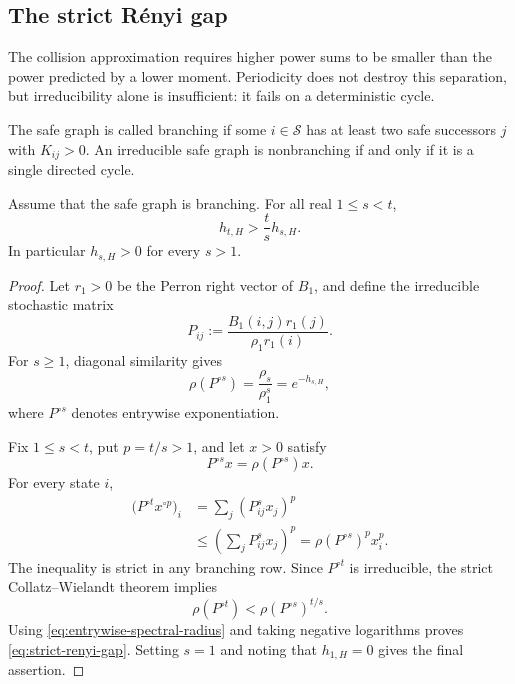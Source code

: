 \subsection{The strict R\'enyi gap}

The collision approximation requires higher power sums to be smaller
than the power predicted by a lower moment.  Periodicity does not
destroy this separation, but irreducibility alone is insufficient: it
fails on a deterministic cycle.

\begin{definition}
The safe graph is called branching if some \(i\in\mathcal S\) has at
least two safe successors \(j\) with \(K_{ij}>0\).  An irreducible safe
graph is nonbranching if and only if it is a single directed cycle.
\end{definition}

\begin{proposition}
\label{prop:strict-renyi-gap}
Assume that the safe graph is branching.  For all real
\(1\leq s<t\),
\begin{equation}
  h_{t,H}>\frac{t}{s}h_{s,H}.
  \label{eq:strict-renyi-gap}
\end{equation}
In particular \(h_{s,H}>0\) for every \(s>1\).
\end{proposition}

\begin{proof}
Let \(r_1>0\) be the Perron right vector of \(B_1\), and define the
irreducible stochastic matrix
\[
  P_{ij}:=\frac{B_1(i,j)r_1(j)}{\rho_1r_1(i)}.
\]
For \(s\geq1\), diagonal similarity gives
\begin{equation}
  \rho(P^{\circ s})=\frac{\rho_s}{\rho_1^s}=e^{-h_{s,H}},
  \label{eq:entrywise-spectral-radius}
\end{equation}
where \(P^{\circ s}\) denotes entrywise exponentiation.

Fix \(1\leq s<t\), put \(p=t/s>1\), and let \(x>0\) satisfy
\[
  P^{\circ s}x=\rho(P^{\circ s})x.
\]
For every state \(i\),
\begin{align*}
  \bigl(P^{\circ t}x^{\circ p}\bigr)_i
  &=\sum_j(P_{ij}^s x_j)^p\\
  &\leq\left(\sum_jP_{ij}^s x_j\right)^p
   =\rho(P^{\circ s})^p x_i^p.
\end{align*}
The inequality is strict in any branching row.  Since
\(P^{\circ t}\) is irreducible, the strict Collatz--Wielandt theorem
implies
\[
  \rho(P^{\circ t})<\rho(P^{\circ s})^{t/s}.
\]
Using \eqref{eq:entrywise-spectral-radius} and taking negative
logarithms proves \eqref{eq:strict-renyi-gap}.  Setting \(s=1\) and
noting that \(h_{1,H}=0\) gives the final assertion.
\end{proof}

